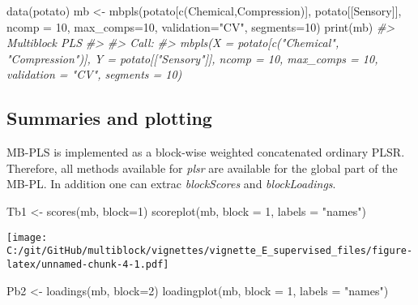 \documentclass[
]{article}
\newenvironment{Shaded}{\begin{snugshade}}{\end{snugshade}}
\newcommand{\AttributeTok}[1]{\textcolor[rgb]{0.77,0.63,0.00}{#1}}
\newcommand{\CommentTok}[1]{\textcolor[rgb]{0.56,0.35,0.01}{\textit{#1}}}
\newcommand{\DecValTok}[1]{\textcolor[rgb]{0.00,0.00,0.81}{#1}}
\newcommand{\FunctionTok}[1]{\textcolor[rgb]{0.00,0.00,0.00}{#1}}
\newcommand{\NormalTok}[1]{#1}
\newcommand{\OtherTok}[1]{\textcolor[rgb]{0.56,0.35,0.01}{#1}}
\newcommand{\StringTok}[1]{\textcolor[rgb]{0.31,0.60,0.02}{#1}}
\begin{document}
\begin{Shaded}
\begin{Highlighting}[]
\FunctionTok{data}\NormalTok{(potato)}
\NormalTok{mb }\OtherTok{\textless{}{-}} \FunctionTok{mbpls}\NormalTok{(potato[}\FunctionTok{c}\NormalTok{(}\StringTok{\textquotesingle{}Chemical\textquotesingle{}}\NormalTok{,}\StringTok{\textquotesingle{}Compression\textquotesingle{}}\NormalTok{)], potato[[}\StringTok{\textquotesingle{}Sensory\textquotesingle{}}\NormalTok{]], }\AttributeTok{ncomp =} \DecValTok{10}\NormalTok{,}
            \AttributeTok{max\_comps=}\DecValTok{10}\NormalTok{, }\AttributeTok{validation=}\StringTok{"CV"}\NormalTok{, }\AttributeTok{segments=}\DecValTok{10}\NormalTok{)}
\FunctionTok{print}\NormalTok{(mb)}
\CommentTok{\#\textgreater{} Multiblock PLS }
\CommentTok{\#\textgreater{} }
\CommentTok{\#\textgreater{} Call:}
\CommentTok{\#\textgreater{} mbpls(X = potato[c("Chemical", "Compression")], Y = potato[["Sensory"]],     ncomp = 10, max\_comps = 10, validation = "CV", segments = 10)}
\end{Highlighting}
\end{Shaded}

\hypertarget{summaries-and-plotting}{%
\subsection{Summaries and plotting}\label{summaries-and-plotting}}

MB-PLS is implemented as a block-wise weighted concatenated ordinary
PLSR. Therefore, all methods available for \emph{plsr} are available for
the global part of the MB-PL. In addition one can extrac
\emph{blockScores} and \emph{blockLoadings}.

\begin{Shaded}
\begin{Highlighting}[]
\NormalTok{Tb1 }\OtherTok{\textless{}{-}} \FunctionTok{scores}\NormalTok{(mb, }\AttributeTok{block=}\DecValTok{1}\NormalTok{)}
\FunctionTok{scoreplot}\NormalTok{(mb, }\AttributeTok{block =} \DecValTok{1}\NormalTok{, }\AttributeTok{labels =} \StringTok{"names"}\NormalTok{)}
\end{Highlighting}
\end{Shaded}

\texttt{[image: C:/git/GitHub/multiblock/vignettes/vignette\_E\_supervised\_files/figure-latex/unnamed-chunk-4-1.pdf]}

\begin{Shaded}
\begin{Highlighting}[]

\NormalTok{Pb2 }\OtherTok{\textless{}{-}} \FunctionTok{loadings}\NormalTok{(mb, }\AttributeTok{block=}\DecValTok{2}\NormalTok{)}
\FunctionTok{loadingplot}\NormalTok{(mb, }\AttributeTok{block =} \DecValTok{1}\NormalTok{, }\AttributeTok{labels =} \StringTok{"names"}\NormalTok{)}
\end{Highlighting}
\end{Shaded}
\end{document}
